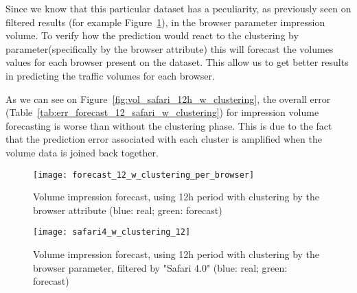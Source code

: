 Since we know that this particular dataset has a peculiarity, as previously seen
on filtered results (for example Figure~\ref{fig:vol_safari_12h_w_clustering_safari_4}), in the browser
parameter impression volume. To verify how the prediction would react to the clustering by
parameter(specifically by the browser attribute) this will forecast the volumes
values for each browser present on the dataset. This allow us to get better results in
predicting the traffic volumes for each browser.

As we can see on Figure~\ref{fig:vol_safari_12h_w_clustering}, the overall error
(Table~\ref{tab:err_forecast_12_safari_w_clustering}) for impression volume
forecasting is worse than without the clustering phase. This is due to the fact that the prediction error
associated with each cluster is amplified when the volume data is joined
back together.

\begin{figure}[!ht]
\centering
\begin{minipage}[b]{0.45\linewidth}
\texttt{[image: forecast\_12\_w\_clustering\_per\_browser]} \caption[Volume
impression forecast, safari 4, clustering by browser]{Volume impression
forecast, using 12h period with clustering by the browser attribute (blue: real; green: forecast)}
\label{fig:vol_safari_12h_w_clustering}
\end{minipage}
\quad
\begin{minipage}[b]{0.45\linewidth}
\texttt{[image: safari4\_w\_clustering\_12]} \caption[Volume
impression forecast, safari 4, clustering by browser, filtered]{Volume impression
forecast, using 12h period with clustering by the browser parameter, filtered by "Safari 4.0" (blue: real; green: forecast)}
\label{fig:vol_safari_12h_w_clustering_safari_4}
\end{minipage}

\end{figure}

